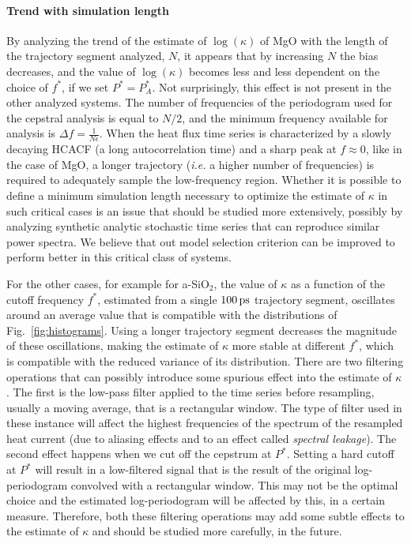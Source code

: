 \begin{LEtext}
\paragraph{Trend with simulation length}
By analyzing the trend of the estimate of $\log(\kappa)$ of MgO with the length of the trajectory segment analyzed, $N$, it appears that by increasing $N$ the bias decreases, and the value of $\log(\kappa)$ becomes less and less dependent on the choice of $f^*$, if we set $P^*=P_A^*$. Not surprisingly, this effect is not present in the other analyzed systems. The number of frequencies of the periodogram used for the cepstral analysis is equal to $N/2$, and the minimum frequency available for analysis is $\Delta f = \frac{1}{N\epsilon}$. 
When the heat flux time series is characterized by a slowly decaying HCACF (a long autocorrelation time) and a sharp peak at $f\approx 0$, like in the case of MgO, a longer trajectory (\emph{i.e.} a higher number of frequencies) is required to adequately sample the low-frequency region. 
Whether it is possible to define a minimum simulation length necessary to optimize the estimate of $\kappa$ in such critical cases is an issue that should be studied more extensively, possibly by analyzing synthetic analytic stochastic time series that can reproduce similar power spectra. 
We believe that out model selection criterion can be improved to perform better in this critical class of systems. 

For the other cases, for example for a-SiO$_2$, the value of $\kappa$ as a function of the cutoff frequency $f^*$, estimated from a single $100\,\mathrm{ps}$ trajectory segment, oscillates around an average value that is compatible with the distributions of Fig.~\ref{fig:histograms}. 
Using a longer trajectory segment decreases the magnitude of these oscillations, making the estimate of $\kappa$ more stable at different $f^*$, which is compatible with the reduced variance of its distribution. 
There are two filtering operations that can possibly introduce some spurious effect into the estimate of $\kappa$. 
The first is the low-pass filter applied to the time series before resampling, usually a moving average, that is a rectangular window. 
The type of filter used in these instance will affect the highest frequencies of the spectrum of the resampled heat current (due to aliasing effects and to an effect called \emph{spectral leakage}). 
The second effect happens when we cut off the cepstrum at $P^*$. Setting a hard cutoff at $P^*$ will result in a low-filtered signal that is the result of the original log-periodogram convolved with a rectangular window. This may not be the optimal choice and the estimated log-periodogram will be affected by this, in a certain measure. 
Therefore, both these filtering operations may add some subtle effects to the estimate of $\kappa$ and should be studied more carefully, in the future. 
\end{LEtext}


